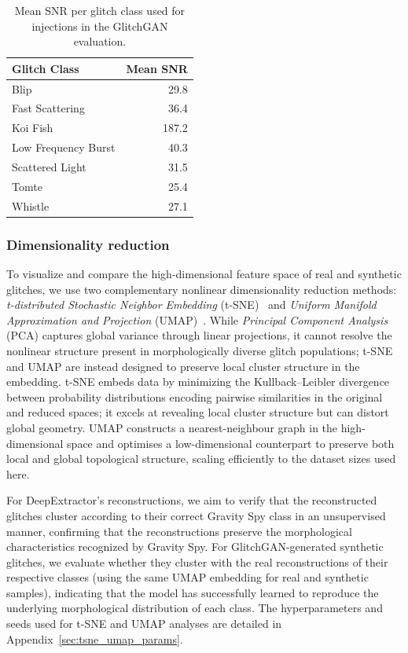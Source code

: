 \documentclass[reprint,nofootinbib,amsmath,amssymb,aps,floatfix]{revtex4-2}
\begin{document}
\begin{table}[h]
\centering
\caption{Mean SNR per glitch class used for injections in the GlitchGAN evaluation.}
\label{tab:injection_snr}
\begin{tabular}{l r}
\toprule
Glitch Class & Mean SNR \\
\midrule
Blip              & 29.8  \\
Fast Scattering   & 36.4  \\
Koi Fish          & 187.2 \\
Low Frequency Burst & 40.3 \\
Scattered Light   & 31.5  \\
Tomte             & 25.4  \\
Whistle           & 27.1  \\
\bottomrule
\end{tabular}
\end{table}


\subsubsection{Dimensionality reduction}
To visualize and compare the high-dimensional feature space of real and synthetic glitches, we use two complementary nonlinear dimensionality reduction methods: \textit{t-distributed Stochastic Neighbor Embedding} (t-SNE)~\cite{TSNE} and \textit{Uniform Manifold Approximation and Projection} (UMAP)~\cite{McInnes_2018}. While \textit{Principal Component Analysis} (PCA) captures global variance through linear projections, it cannot resolve the nonlinear structure present in morphologically diverse glitch populations; t-SNE and UMAP are instead designed to preserve local cluster structure in the embedding. t-SNE embeds data by minimizing the Kullback--Leibler divergence between probability distributions encoding pairwise similarities in the original and reduced spaces; it excels at revealing local cluster structure but can distort global geometry. UMAP constructs a nearest-neighbour graph in the high-dimensional space and optimises a low-dimensional counterpart to preserve both local and global topological structure, scaling efficiently to the dataset sizes used here.

For DeepExtractor's reconstructions, we aim to verify that the reconstructed glitches cluster according to their correct Gravity Spy class in an unsupervised manner, confirming that the reconstructions preserve the morphological characteristics recognized by Gravity Spy.
For GlitchGAN-generated synthetic glitches, we evaluate whether they cluster with the real reconstructions of their respective classes (using the same UMAP embedding for real and synthetic samples), indicating that the model has successfully learned to reproduce the underlying morphological distribution of each class.
The hyperparameters and seeds used for t-SNE and UMAP analyses are detailed in Appendix~\ref{sec:tsne_umap_params}.
\end{document}
